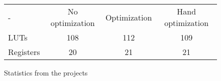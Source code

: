 \begin{figure}
	\centering
	\begin{tabular}{ l c c c }
		 -        & No optimization & Optimization & Hand optimization \\
		LUTs      & 108             & 112          & 109\\
		Registers & 20              & 21           & 21\\
	\end{tabular}
	\caption{Statistics from the projects}
\label{table:vhdl_improvements}
\end{figure}